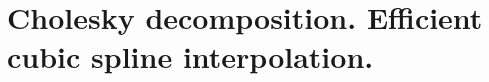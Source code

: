 \chapter{Cholesky decomposition. Efficient cubic spline interpolation.}
\label{ch:06}















